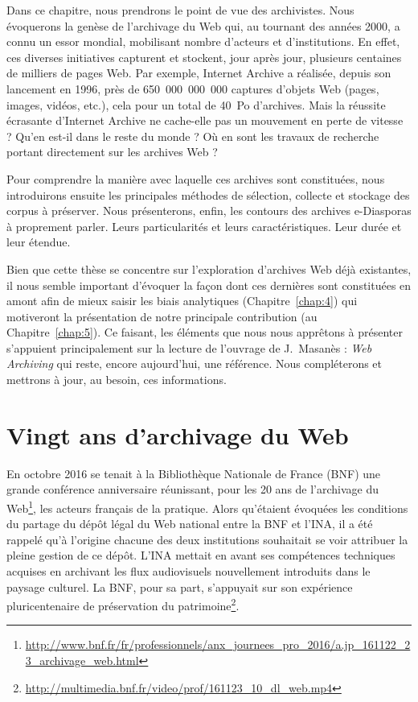 \documentclass[symmetric,justified,marginals=raggedouter]{tufte-book}
\begin{document}
Dans ce chapitre, nous prendrons le point de vue des archivistes. Nous évoquerons la genèse de l'archivage du Web qui, au tournant des années 2000, a connu un essor mondial, mobilisant nombre d'acteurs et d'institutions. En effet, ces diverses initiatives capturent et stockent, jour après jour, plusieurs centaines de milliers de pages Web. Par exemple, Internet Archive a réalisée, depuis son lancement en 1996, près de 650~000~000~000 captures d'objets Web (pages, images, vidéos, etc.), cela pour un total de 40~Po d'archives. Mais la réussite écrasante d'Internet Archive ne cache-elle pas un mouvement en perte de vitesse ? Qu'en est-il dans le reste du monde ? Où en sont les travaux de recherche portant directement sur les archives Web ?

Pour comprendre la manière avec laquelle ces archives sont constituées, nous introduirons ensuite les principales méthodes de sélection, collecte et stockage des corpus à préserver. Nous présenterons, enfin, les contours des archives e-Diaspo\-ras à proprement parler. Leurs particularités et leurs caractéristiques. Leur durée et leur étendue.

Bien que cette thèse se concentre sur l'exploration d'archives Web déjà existantes, il nous semble important d'évoquer la façon dont ces dernières sont constituées en amont afin de mieux saisir les biais analytiques (Chapitre~\ref{chap:4}) qui motiveront la présentation de notre principale contribution (au Chapitre~\ref{chap:5}). Ce faisant, les éléments que nous nous apprêtons à présenter s'appuient principalement sur la lecture de l'ouvrage de J.~Masanès : \textit{Web Archiving} \citep{masanes_web_2006} qui reste, encore aujourd'hui, une référence. Nous compléterons et mettrons à jour, au besoin, ces informations.\\

\section{Vingt ans d'archivage du Web}
\label{sec:3_20ans}

\noindent En octobre 2016 se tenait à la Bibliothèque Nationale de France (BNF) une grande conférence anniversaire réunissant, pour les 20 ans de l'archivage du Web\footnote{\RaggedOuter \url{http://www.bnf.fr/fr/professionnels/anx_journees_pro_2016/a.jp_161122_23_archivage_web.html}}, les acteurs français de la pratique. Alors qu'étaient évoquées les conditions du partage du dépôt légal du Web national entre la BNF et l'INA, il a été rappelé qu'à l'origine chacune des deux institutions souhaitait se voir attribuer la pleine gestion de ce dépôt. L'INA mettait en avant ses compétences techniques acquises en archivant les flux audiovisuels nouvellement introduits dans le paysage culturel. La BNF, pour sa part, s'appuyait sur son expérience pluricentenaire de préservation du patrimoine\footnote{\RaggedOuter \url{http://multimedia.bnf.fr/video/prof/161123_10_dl_web.mp4}}. 
\end{document}
